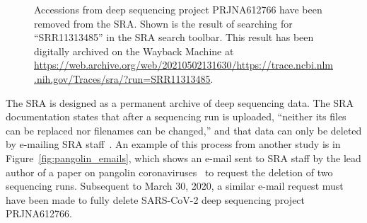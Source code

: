 \documentclass[9pt,twocolumn,twoside]{gsajnl_modified}
\begin{document}
\begin{figure}[]
\centering
{}
\caption{Accessions from deep sequencing project PRJNA612766 have been removed from the SRA.
Shown is the result of searching for ``SRR11313485'' in the SRA search toolbar.
This result has been digitally archived on the Wayback Machine at \url{https://web.archive.org/web/20210502131630/https://trace.ncbi.nlm.nih.gov/Traces/sra/?run=SRR11313485}.
}%
\label{fig:acc_removed}
\end{figure}

The SRA is designed as a permanent archive of deep sequencing data.
The SRA documentation states that after a sequencing run is uploaded, ``neither its files can be replaced nor filenames can be changed,'' and that data can only be deleted by e-mailing SRA staff~\citep{SRA_deletion}.
An example of this process from another study is in Figure~\ref{fig:pangolin_emails}, which shows an e-mail sent to SRA staff by the lead author of a paper on pangolin coronaviruses~\citep{xiao2020isolation} to request the deletion of two sequencing runs.
Subsequent to March 30, 2020, a similar e-mail request must have been made to fully delete SARS-CoV-2 deep sequencing project PRJNA612766.
\end{document}
